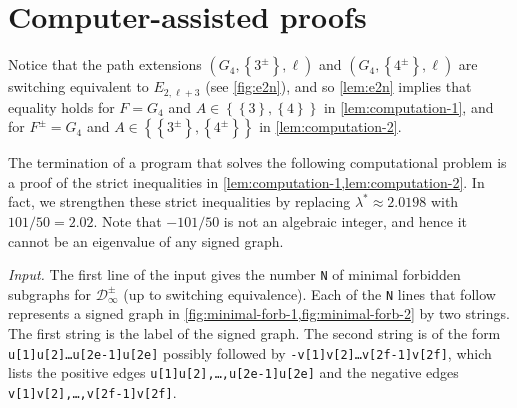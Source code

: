 \documentclass[11pt]{article}
\theoremstyle{definition}
\theoremstyle{remark}
\newcommand{\sset}[1]{\left\{{#1}\right\}}
\newcommand{\la}{\lambda}
\newcommand{\D}{\mathcal{D}}
\begin{document}
\appendix

\section{Computer-assisted proofs} \label{sec:numerics}

Notice that the path extensions $(G_4, \sset{3^\pm}, \ell)$ and $(G_4, \sset{4^\pm}, \ell)$ are switching equivalent to $E_{2, \ell+3}$ (see \cref{fig:e2n}), and so \cref{lem:e2n} implies that equality holds for $F = G_4$ and $A \in \sset{\sset{3},\sset{4}}$ in \cref{lem:computation-1}, and for $F^\pm = G_4$ and $A \in \sset{\sset{3^\pm},\sset{4^\pm}}$ in \cref{lem:computation-2}.

The termination of a program that solves the following computational problem is a proof of the strict inequalities in \cref{lem:computation-1,lem:computation-2}. In fact, we strengthen these strict inequalities by replacing $\la^* \approx 2.0198$ with $101/50 = 2.02$. Note that $-101/50$ is not an algebraic integer, and hence it cannot be an eigenvalue of any signed graph.

\bigskip
\noindent\textit{Input.} The first line of the input gives the number \texttt{N} of minimal forbidden subgraphs for $\D_\infty^\pm$ (up to switching equivalence). Each of the \texttt{N} lines that follow represents a signed graph in \cref{fig:minimal-forb-1,fig:minimal-forb-2} by two strings. The first string is the label of the signed graph. The second string is of the form \texttt{u[1]u[2]\ldots u[2e-1]u[2e]} possibly followed by \texttt{-v[1]v[2]\ldots v[2f-1]v[2f]}, which lists the positive edges \texttt{u[1]u[2],\ldots ,u[2e-1]u[2e]} and the negative edges \texttt{v[1]v[2],\ldots ,v[2f-1]v[2f]}.
\end{document}
